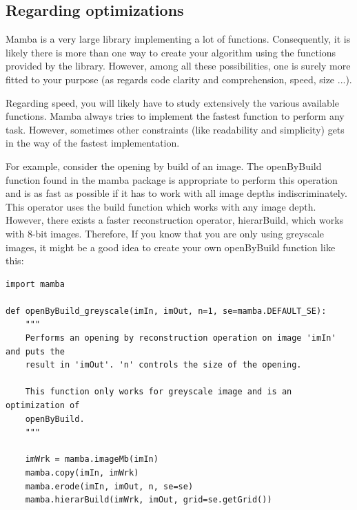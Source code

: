 \documentclass[a4paper,10pt,oneside]{article}
\begin{document}

\subsection{Regarding optimizations}


Mamba is a very large library implementing a lot of functions. Consequently, it
is likely there is more than one way to create your algorithm using the functions
provided by the library. However, among all these possibilities, one is surely more
fitted to your purpose (as regards code clarity and comprehension, speed, size ...).

Regarding speed, you will likely have to study extensively the various
available functions. Mamba always tries to implement the fastest function to 
perform any task. However, sometimes other constraints (like readability and
simplicity) gets in the way of the fastest implementation.

For example, consider the opening by build of an image. The openByBuild function
found in the mamba package is appropriate to perform this operation and
is as fast as possible if it has to work with all image depths indiscriminately.
This operator uses the build function which works with any image
depth. However, there exists a faster reconstruction operator,
hierarBuild, which works with 8-bit images. Therefore, If you know that you are
only using greyscale images, it might be a good idea to create your own openByBuild
function like this:

\lstset{language=Python}
\begin{lstlisting}
import mamba

def openByBuild_greyscale(imIn, imOut, n=1, se=mamba.DEFAULT_SE):
    """
    Performs an opening by reconstruction operation on image 'imIn' and puts the
    result in 'imOut'. 'n' controls the size of the opening.
    
    This function only works for greyscale image and is an optimization of
    openByBuild.
    """
    
    imWrk = mamba.imageMb(imIn)
    mamba.copy(imIn, imWrk)
    mamba.erode(imIn, imOut, n, se=se)
    mamba.hierarBuild(imWrk, imOut, grid=se.getGrid())
\end{lstlisting}
\end{document}
